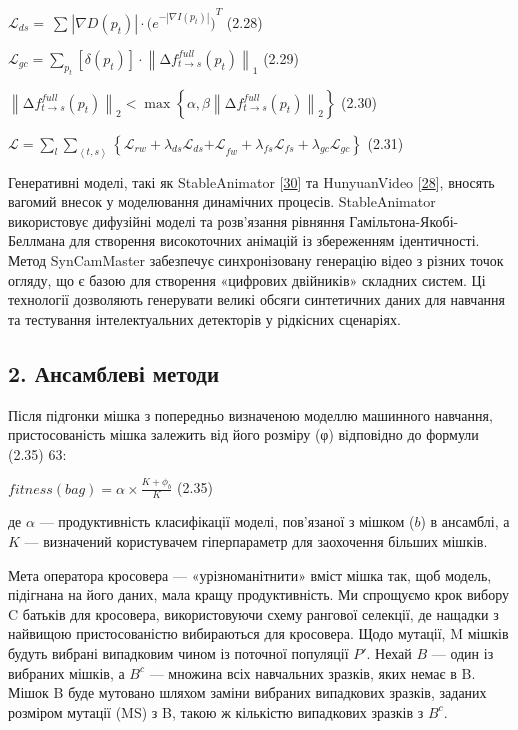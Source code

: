 \documentclass[
]{article}
\begin{document}
\(\mathcal{L}_{ds} = \ {\sum_{}^{}\left| \nabla D\left( p_{t} \right) \right| \cdot {(e}^{- \left| \nabla I\left( p_{t} \right) \right|})}^{T}\) (2.28)

\(\mathcal{L}_{gc} = \sum_{p_{t}}^{}{\left\lbrack \delta\left( p_{t} \right) \right\rbrack \cdot \left\| \mathrm{\Delta}f_{t \rightarrow s}^{full}\left( p_{t} \right) \right\|_{1}}\) (2.29)

\(\left\| \mathrm{\Delta}f_{t \rightarrow s}^{full}\left( p_{t} \right) \right\|_{2} < \max\left\{ \alpha,\beta\left\| \mathrm{\Delta}f_{t \rightarrow s}^{full}\left( p_{t} \right) \right\|_{2} \right\}\) (2.30)

\(\mathcal{L =}\sum_{l}^{}{\sum_{\left\langle t,s \right\rangle}^{}\left\{ \mathcal{L}_{rw} + {\lambda_{ds}\mathcal{L}_{ds}\mathcal{+ L}}_{fw} + \lambda_{fs}\mathcal{L}_{fs} + \lambda_{gc}\mathcal{L}_{gc} \right\}}\) (2.31)

Генеративні моделі, такі як StableAnimator {[}\hyperref[_Ref221609081]{30}{]} та HunyuanVideo {[}\hyperref[_Ref221609062]{28}{]}, вносять вагомий внесок у моделювання динамічних процесів. StableAnimator використовує дифузійні моделі та розв'язання рівняння Гамільтона-Якобі-Беллмана для створення високоточних анімацій із збереженням ідентичності. Метод SynCamMaster забезпечує синхронізовану генерацію відео з різних точок огляду, що є базою для створення «цифрових двійників» складних систем. Ці технології дозволяють генерувати великі обсяги синтетичних даних для навчання та тестування інтелектуальних детекторів у рідкісних сценаріях.

\subsection{2. Ансамблеві методи}\label{ux430ux43dux441ux430ux43cux431ux43bux435ux432ux456-ux43cux435ux442ux43eux434ux438}

Після підгонки мішка з попередньо визначеною моделлю машинного навчання, пристосованість мішка залежить від його розміру (φ) відповідно до формули (2.35) 63:

\(fitness(bag) = \alpha \times \frac{K + \phi_{b}}{K}\) (2.35)

де \(\alpha\) --- продуктивність класифікації моделі, пов'язаної з мішком (\(b\)) в ансамблі, а \(K\) --- визначений користувачем гіперпараметр для заохочення більших мішків.

Мета оператора кросовера --- «урізноманітнити» вміст мішка так, щоб модель, підігнана на його даних, мала кращу продуктивність. Ми спрощуємо крок вибору C батьків для кросовера, використовуючи схему рангової селекції, де нащадки з найвищою пристосованістю вибираються для кросовера. Щодо мутації, M мішків будуть вибрані випадковим чином із поточної популяції \(P'\). Нехай \(B\) --- один із вибраних мішків, а \(B^{c}\) --- множина всіх навчальних зразків, яких немає в B. Мішок B буде мутовано шляхом заміни вибраних випадкових зразків, заданих розміром мутації (MS) з B, такою ж кількістю випадкових зразків з \(B^{c}\).
\end{document}

